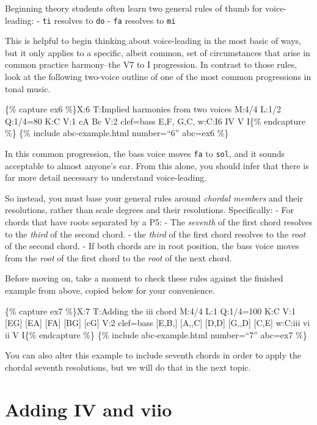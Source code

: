 \documentclass{book}
\begin{document}
Beginning theory students often learn two general rules of thumb for
voice-leading: - \texttt{ti} resolves to \texttt{do} - \texttt{fa} resolves to
\texttt{mi}

This is helpful to begin thinking about voice-leading in the most basic of
ways, but it only applies to a specific, albeit common, set of circumstances
that arise in common practice harmony--the V7 to I progression. In contrast to
those rules, look at the following two-voice outline of one of the most common
progressions in tonal music.

\{\% capture ex6 \%\}X:6 T:Implied harmonies from two voices M:4/4 L:1/2
Q:1/4=80 K:C V:1 cA\textbar{} Bc\textbar{]} V:2 clef=bass E,F,\textbar{}
G,C,\textbar{]} w:C:I6 IV V I\{\% endcapture \%\} \{\% include
abc-example.html number=``6'' abc=ex6 \%\}

In this common progression, the bass voice moves \texttt{fa} to \texttt{sol},
and it sounds acceptable to almost anyone's ear. From this alone, you should
infer that there is far more detail necessary to understand voice-leading.

So instead, you must base your general rules around \emph{chordal members} and
their resolutions, rather than scale degrees and their resolutions.
Specifically: - For chords that have roots separated by a P5: - The
\emph{seventh} of the first chord resolves to the \emph{third} of the second
chord. - the \emph{third} of the first chord resolves to the \emph{root} of
the second chord. - If both chords are in root position, the bass voice moves
from the \emph{root} of the first chord to the \emph{root} of the next chord.

Before moving on, take a moment to check these rules against the finished
example from above, copied below for your convenience.

\{\% capture ex7 \%\}X:7 T:Adding the iii chord M:4/4 L:1 Q:1/4=100 K:C V:1
{[}EG{]}\textbar{} {[}EA{]}\textbar{} {[}FA{]}\textbar{} {[}BG{]}\textbar{}
{[}cG{]}\textbar{]} V:2 clef=bass {[}E,B,{]}\textbar{} {[}A,,C{]}\textbar{}
{[}D,D{]}\textbar{} {[}G,,D{]}\textbar{} {[}C,E{]}\textbar{]} w:C:iii vi ii V
I\{\% endcapture \%\} \{\% include abc-example.html number=``7'' abc=ex7 \%\}

You can also alter this example to include seventh chords in order to apply
the chordal seventh resolutions, but we will do that in the next topic.

\hypertarget{adding-iv-and-viio}{%
\section{Adding IV and viio}\label{adding-iv-and-viio}}
\end{document}
